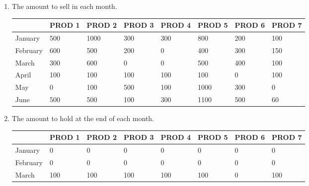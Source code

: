 \documentclass[12pt,a4paper]{article}
\theoremstyle{definition}
\begin{document}
\begin{enumerate}
\begin{enumerate}
\begin{enumerate}
\begin{enumerate}
\begin{table}[H]
\begin{tabular}
      \hline
      \end{tabular}
    \end{table}
    \item
    The amount to sell in each month.
    \begin{table}[H]
      \scriptsize
      \centering
      \renewcommand\arraystretch{1.1}
      \begin{tabular}{m{} m{}<{\centering} m{}<{\centering} m{}<{\centering} m{}<{\centering} m{}<{\centering} m{}<{\centering} m{}<{\centering}}
      \hline
       & \textbf{PROD 1} & \textbf{PROD 2} & \textbf{PROD 3} & \textbf{PROD 4} & \textbf{PROD 5} & \textbf{PROD 6} &  \textbf{PROD 7} \\\hline
      January   & 500 & 1000  & 300   & 300   & 800   & 200 & 100 \\
      February  & 600 & 500   & 200   & 0     & 400   & 300 & 150 \\
      March     & 300 & 600   & 0     & 0     & 500   & 400 & 100 \\
      April     & 100 & 100   & 100   & 100   & 100   & 0   & 100 \\
      May       & 0   & 100   & 500   & 100   & 1000  & 300 & 0 \\
      June      & 500 & 500   & 100   & 300   & 1100  & 500 & 60 \\
      \hline
      \end{tabular}
    \end{table}
    \item
    The amount to hold at the end of each month.
    \begin{table}[H]
      \scriptsize
      \centering
      \renewcommand\arraystretch{1.1}
      \begin{tabular}{m{} m{}<{\centering} m{}<{\centering} m{}<{\centering} m{}<{\centering} m{}<{\centering} m{}<{\centering} m{}<{\centering}}
      \hline
       & \textbf{PROD 1} & \textbf{PROD 2} & \textbf{PROD 3} & \textbf{PROD 4} & \textbf{PROD 5} & \textbf{PROD 6} &  \textbf{PROD 7} \\\hline
      January   & 0 & 0  & 0   & 0   & 0   & 0 & 0 \\
      February  & 0 & 0   & 0   & 0     & 0   & 0 & 0 \\
      March     & 100 & 100   & 100     & 100     & 100   & 0 & 100 \\

\end{tabular}
\end{table}
\end{enumerate}
\end{enumerate}
\end{enumerate}
\end{enumerate}
\end{document}
